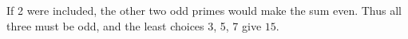 If 2 were included, the other two odd primes would make the sum even. Thus all three must be odd, and the least choices 3, 5, 7 give $\boxed{15}$.
